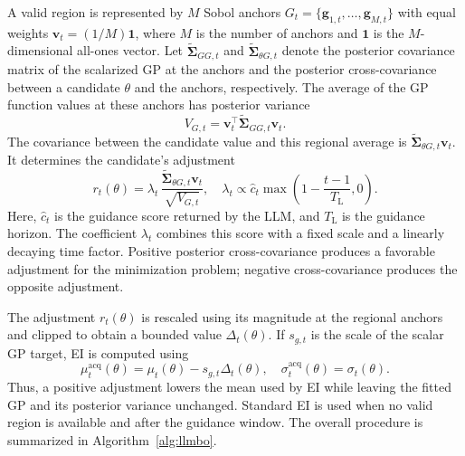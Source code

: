 \documentclass[journal]{IEEEtran}
\begin{document}
A valid region is represented by $M$ Sobol anchors
$G_t=\{\mathbf g_{1,t},\ldots,\mathbf g_{M,t}\}$ with equal weights
$\mathbf v_t=(1/M)\mathbf 1$, where $M$ is the number of anchors and
$\mathbf 1$ is the $M$-dimensional all-ones vector. Let
$\widetilde{\boldsymbol\Sigma}_{GG,t}$ and
$\widetilde{\boldsymbol\Sigma}_{\theta G,t}$ denote the posterior covariance
matrix of the scalarized GP at the anchors and the posterior cross-covariance
between a candidate $\theta$ and the anchors, respectively. The average of
the GP function values at these anchors has posterior variance
\begin{equation}
 V_{G,t}=\mathbf v_t^{\top}
 \widetilde{\boldsymbol\Sigma}_{GG,t}\mathbf v_t.
 \label{eq:region_variance}
\end{equation}
The covariance between the candidate value and this regional average is
$\widetilde{\boldsymbol\Sigma}_{\theta G,t}\mathbf v_t$. It determines the
candidate's adjustment
\begin{equation}
 r_t(\theta)=
 \lambda_t\,
 \frac{\widetilde{\boldsymbol\Sigma}_{\theta G,t}\mathbf v_t}
 {\sqrt{V_{G,t}}},
 \quad
 \lambda_t\propto
 \widehat c_t\max\!\left(1-\frac{t-1}{T_{\mathrm L}},0\right).
 \label{eq:region_adjustment}
\end{equation}
Here, $\widehat c_t$ is the guidance score returned by the LLM, and
$T_{\mathrm L}$ is the guidance horizon. The coefficient $\lambda_t$ combines
this score with a fixed scale and a linearly decaying time factor. Positive posterior
cross-covariance produces a favorable adjustment for the minimization
problem; negative cross-covariance produces the opposite adjustment.

The adjustment $r_t(\theta)$ is rescaled using its magnitude at the regional
anchors and clipped to obtain a bounded value $\Delta_t(\theta)$. If
$s_{g,t}$ is the scale of the scalar GP target, EI is computed using
\begin{equation}
 \mu_t^{\mathrm{acq}}(\theta)
 =\mu_t(\theta)-s_{g,t}\Delta_t(\theta),
 \quad
 \sigma_t^{\mathrm{acq}}(\theta)=\sigma_t(\theta).
 \label{eq:region_acq_mean}
\end{equation}
Thus, a positive adjustment lowers the mean used by EI while leaving the
fitted GP and its posterior variance unchanged. Standard EI is used when no
valid region is available and after the guidance window.
The overall procedure is summarized in Algorithm~\ref{alg:llmbo}.
\end{document}
